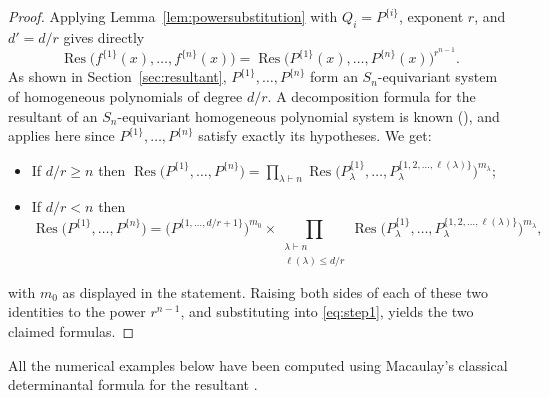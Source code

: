 \documentclass[12pt]{amsart}
\theoremstyle{definition}
\newcommand{\Res}{\operatorname{Res}}
\DeclareMathOperator{\len}{\ell}
\begin{document}
\begin{proof}
Applying Lemma~\ref{lem:powersubstitution} with $Q_i = P^{\{i\}}$, exponent $r$, and $d' = d/r$ gives directly
\begin{equation}
\label{eq:step1}
\Res\big(f^{\{1\}}(x),\dots,f^{\{n\}}(x)\big) = \Res\big(P^{\{1\}}(x),\dots,P^{\{n\}}(x)\big)^{r^{n-1}}.
\end{equation}
As shown in Section~\ref{sec:resultant}, $P^{\{1\}},\dots,P^{\{n\}}$ form an $S_n$-equivariant system of homogeneous polynomials of degree $d/r$. A decomposition formula for the resultant of an $S_n$-equivariant homogeneous polynomial system is known (\citep{BuseKarasoulou2016}), and applies here since $P^{\{1\}},\dots,P^{\{n\}}$ satisfy exactly its hypotheses. We get:
\begin{itemize}
\item If $d/r \geqslant n$ then $\displaystyle \Res\big(P^{\{1\}},\dots,P^{\{n\}}\big) = \prod_{\lambda \vdash n} \Res\Big(P^{\{1\}}_\lambda,\dots,P^{\{1,2,\dots,\len(\lambda)\}}_\lambda\Big)^{m_\lambda}$;
\item If $d/r < n$ then
\[
\Res\big(P^{\{1\}},\dots,P^{\{n\}}\big) = \Big(P^{\{1,\dots,d/r+1\}}\Big)^{m_0} \times \prod_{\substack{\lambda\vdash n\\ \len(\lambda)\leqslant d/r}} \Res\Big(P^{\{1\}}_\lambda,\dots,P^{\{1,2,\dots,\len(\lambda)\}}_\lambda\Big)^{m_\lambda},
\]
\end{itemize}
with $m_0$ as displayed in the statement. Raising both sides of each of these two identities to the power $r^{n-1}$, and substituting into \eqref{eq:step1}, yields the two claimed formulas.
\end{proof}

All the numerical examples below have been computed using Macaulay's classical determinantal formula for the resultant \citep{Macaulay1902}.
\end{document}
